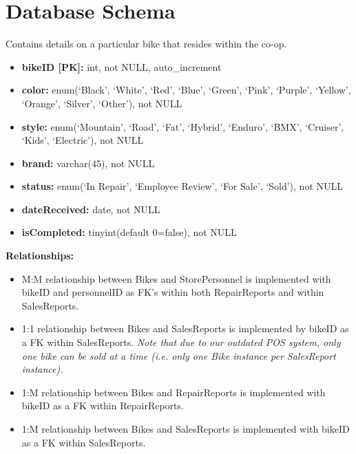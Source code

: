 \documentclass{article}
\begin{document}
\section{Database Schema}

\begin{tcolorbox}[colback=secondarycolor, colframe=primarycolor, title=\textbf{Bikes Table}]
Contains details on a particular bike that resides within the co-op.
\vspace{0.2cm}

\begin{itemize}
  \item \textbf{bikeID [PK]:} int, not NULL, auto\_increment
  \item \textbf{color:} enum(`Black', `White', `Red', `Blue', `Green', `Pink', `Purple', `Yellow', `Orange', `Silver', `Other'), not NULL 
  \item \textbf{style:} enum(`Mountain', `Road', `Fat', `Hybrid', `Enduro', `BMX', `Cruiser', `Kids', `Electric'), not NULL
  \item \textbf{brand:} varchar(45), not NULL
  \item \textbf{status:} enum(`In Repair', `Employee Review', `For Sale', `Sold'), not NULL
  \item \textbf{dateReceived:} date, not NULL
  \item \textbf{isCompleted:} tinyint(default 0=false), not NULL
\end{itemize}
\vspace{0.2cm}

\textbf{Relationships:}
\vspace{0.2cm}
\begin{itemize}
  \item M:M relationship between Bikes and StorePersonnel is implemented with bikeID and personnelID as FK's within both RepairReports and within SalesReports.
  \item 1:1 relationship between Bikes and SalesReports is implemented by bikeID as a FK within SalesReports. \textit{Note that due to our outdated POS system, only one bike can be sold at a time (i.e. only one Bike instance per SalesReport instance).}
  \item 1:M relationship between Bikes and RepairReports is implemented with bikeID as a FK within RepairReports.
  \item 1:M relationship between Bikes and SalesReports is implemented with bikeID as a FK within SalesReports.
\end{itemize}
\end{tcolorbox}
\end{document}

